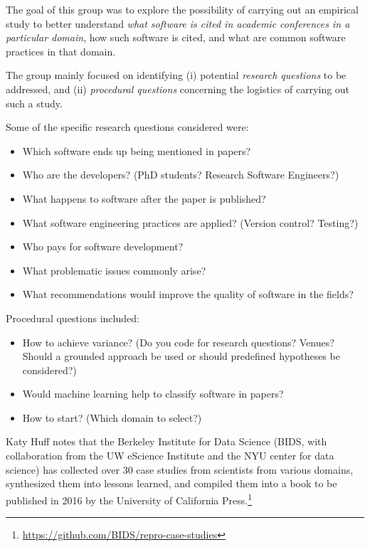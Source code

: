 \documentclass[a4paper,UKenglish]{dagrep}
\begin{document}
The goal of this group was to explore the possibility of carrying out an empirical study to better understand \emph{what software is cited in academic conferences in a particular domain}, how such software is cited, and what are common software practices in that domain.

The group mainly focused on identifying (i) potential \emph{research questions} to be addressed, and (ii) \emph{procedural questions} concerning the logistics of carrying out such a study.

Some of the specific research questions considered were:
\begin{itemize}
\item Which software ends up being mentioned in papers?
\item Who are the developers? (PhD students? Research Software Engineers?)
\item What happens to software after the paper is published?
\item What software engineering practices are applied? (Version control? Testing?)
\item Who pays for software development?
\item What problematic issues commonly arise?
\item What recommendations would improve the quality of software in the fields?
\end{itemize}

Procedural questions included:
\begin{itemize}
\item How to achieve variance? (Do you code for research questions? Venues? Should a grounded approach be used or should predefined hypotheses be considered?)
\item Would machine learning help to classify software in papers?
\item How to start? (Which domain to select?)
\end{itemize}

Katy Huff notes that the Berkeley Institute for Data Science (BIDS, with collaboration from the UW eScience Institute and the NYU center for data science) has collected over 30 case studies from scientists from various domains, synthesized them into lessons learned, and compiled them into a book to be published in 2016 by the University of California Press.\footnote{\url{https://github.com/BIDS/repro-case-studies}}

\end{document}
